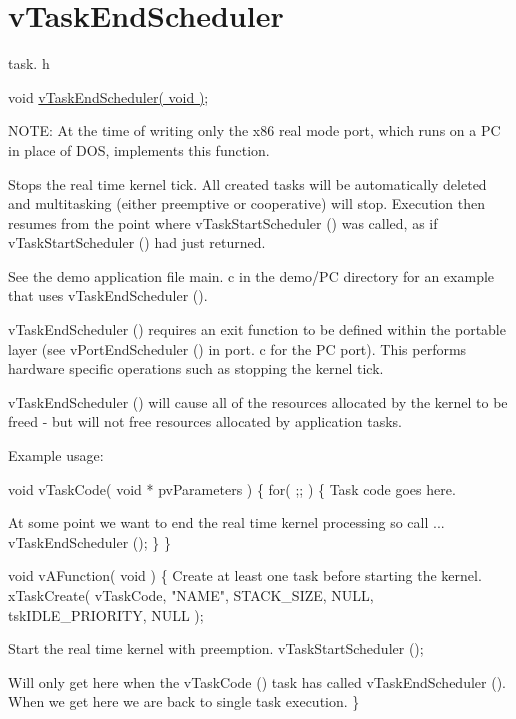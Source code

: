 \hypertarget{group__vTaskEndScheduler}{\section{v\-Task\-End\-Scheduler}
\label{group__vTaskEndScheduler}
}
task. h 
\begin{DoxyPre}void \hyperlink{task_8h_a1651e13c7ccd6273f53a62425ec79a15}{vTaskEndScheduler( void )};\end{DoxyPre}


N\-O\-T\-E\-: At the time of writing only the x86 real mode port, which runs on a P\-C in place of D\-O\-S, implements this function.

Stops the real time kernel tick. All created tasks will be automatically deleted and multitasking (either preemptive or cooperative) will stop. Execution then resumes from the point where v\-Task\-Start\-Scheduler () was called, as if v\-Task\-Start\-Scheduler () had just returned.

See the demo application file main. c in the demo/\-P\-C directory for an example that uses v\-Task\-End\-Scheduler ().

v\-Task\-End\-Scheduler () requires an exit function to be defined within the portable layer (see v\-Port\-End\-Scheduler () in port. c for the P\-C port). This performs hardware specific operations such as stopping the kernel tick.

v\-Task\-End\-Scheduler () will cause all of the resources allocated by the kernel to be freed -\/ but will not free resources allocated by application tasks.

Example usage\-: 
\begin{DoxyPre}
 void vTaskCode( void * pvParameters )
 \{
     for( ;; )
     \{
Task code goes here.\end{DoxyPre}



\begin{DoxyPre}At some point we want to end the real time kernel processing
so call ...
         vTaskEndScheduler ();
     \}
 \}\end{DoxyPre}



\begin{DoxyPre} void vAFunction( void )
 \{
Create at least one task before starting the kernel.
     xTaskCreate( vTaskCode, "NAME", STACK\_SIZE, NULL, tskIDLE\_PRIORITY, NULL );\end{DoxyPre}



\begin{DoxyPre}Start the real time kernel with preemption.
     vTaskStartScheduler ();\end{DoxyPre}



\begin{DoxyPre}Will only get here when the vTaskCode () task has called
vTaskEndScheduler ().  When we get here we are back to single task
execution.
 \}
   \end{DoxyPre}
 